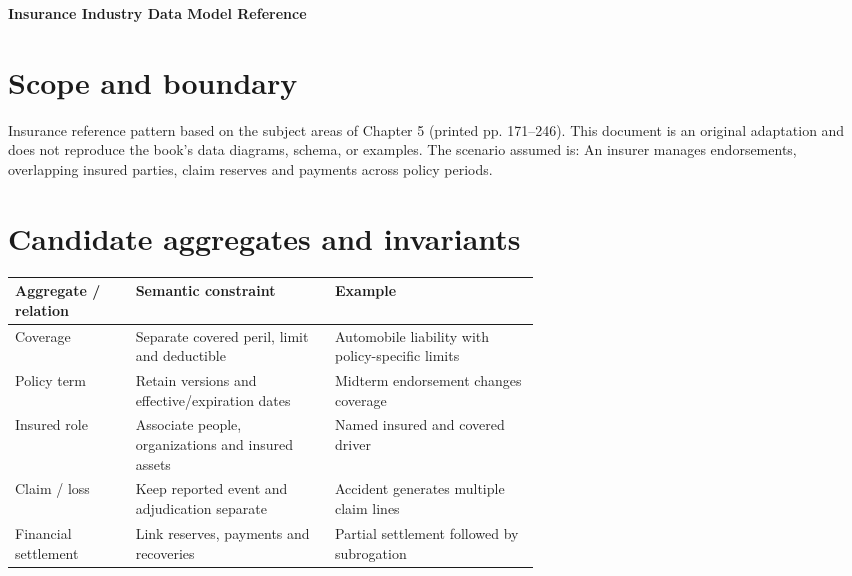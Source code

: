 \documentclass[11pt,letterpaper]{article}
\begin{document}
\begin{center}
{\LARGE\bfseries\color{navy} Insurance Industry Data Model Reference}\par
\vspace{0.25em}{\large Conceptual to logical reference | original adaptation}\par
{}
\end{center}
\vspace{0.8em}
\section{Scope and boundary}
Insurance reference pattern based on the subject areas of Chapter 5 (printed pp. 171--246). This document is an original adaptation and does not reproduce the book's data diagrams, schema, or examples. The scenario assumed is: An insurer manages endorsements, overlapping insured parties, claim reserves and payments across policy periods.


\section{Candidate aggregates and invariants}
\begin{tabularx}{\linewidth}{@{}>{\raggedright\arraybackslash}p{0.23\linewidth} >{\raggedright\arraybackslash}p{0.38\linewidth}>{\raggedright\arraybackslash}X@{}}
\toprule
\textbf{Aggregate / relation} & \textbf{Semantic constraint} & \textbf{Example} \\ 
\midrule
Coverage & Separate covered peril, limit and deductible & Automobile liability with policy-specific limits \\ 
Policy term & Retain versions and effective/expiration dates & Midterm endorsement changes coverage \\ 
Insured role & Associate people, organizations and insured assets & Named insured and covered driver \\ 
Claim / loss & Keep reported event and adjudication separate & Accident generates multiple claim lines \\ 
Financial settlement & Link reserves, payments and recoveries & Partial settlement followed by subrogation \\ 
\bottomrule
\end{tabularx}
\end{document}
